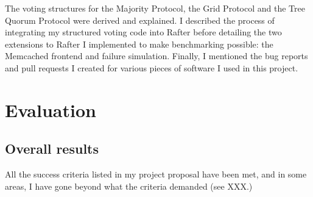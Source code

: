 \documentclass[11pt,chapterprefix=true,toc=bibliography,numbers=noendperiod,
               footnotes=multiple,twoside]{scrreprt}
\begin{document}
The voting structures for the Majority Protocol, the Grid Protocol and the Tree Quorum Protocol were derived and explained. I described the process of integrating my structured voting code into Rafter before detailing the two extensions to Rafter I implemented to make benchmarking possible: the Memcached frontend and failure simulation. Finally, I mentioned the bug reports and pull requests I created for various pieces of software I used in this project.



\chapter{Evaluation\label{ch:evaluation}}



\section{Overall results\label{sc:overall-results}}

All the success criteria listed in my project proposal have been met, and in some areas, I have gone beyond what the criteria demanded (see XXX.)
\end{document}
